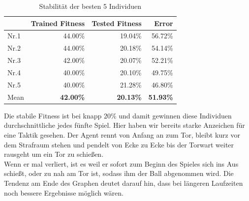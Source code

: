                 \begin{table}[H]
                    \begin{center}
                    \begin{tabular}{ |l|r|r|r| } 
                        \hline
                        \hfill & Trained Fitness   & Tested Fitness  &          Error    \\ \hline
                          Nr.1 &          44.00\%  &         19.04\% &          56.72\%  \\  
                          Nr.2 &          44.00\%  &         20.18\% &          54.14\%  \\  
                          Nr.3 &          42.00\%  &         20.07\% &          52.21\%  \\ 
                          Nr.4 &          40.00\%  &         20.10\% &          49.75\%  \\ 
                          Nr.5 &          40.00\%  &         21.28\% &          46.80\%  \\ \hline
                          Mean &  \textbf{42.00\%} & \textbf{20.13\%} & \textbf{51.93\%}  \\ \hline
                    \end{tabular}
                    \end{center}
                    \caption{Stabilität der besten 5 Individuen \label{fig:neuroevotable}}
                \end{table}

                \noindent
                Die stabile Fitness ist bei knapp 20\% und damit gewinnen diese Individuen durchschnittliche jedes fünfte Spiel. Hier haben wir bereits starke Anzeichen für eine Taktik gesehen. Der Agent rennt von Anfang an zum Tor, bleibt kurz vor dem Strafraum stehen und pendelt von Ecke zu Ecke bis der Torwart weiter rausgeht um ein Tor zu schießen.\\

                \noindent
                Wenn er mal verliert, ist es weil er sofort zum Beginn des Spieles sich ins Aus schießt, oder zu nah am Tor ist, sodass ihm der Ball abgenommen wird. Die Tendenz am Ende des Graphen deutet darauf hin, dass bei längeren Laufzeiten noch bessere Ergebnisse möglich wären.%
\newpage

